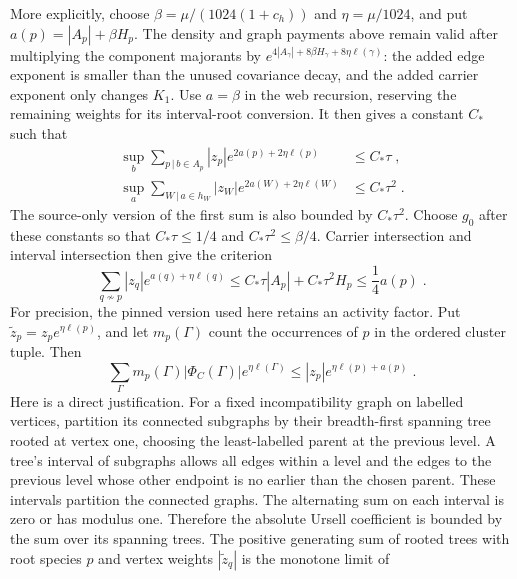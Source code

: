 \documentclass[11pt]{article}
\begin{document}
More explicitly, choose $\beta=\mu/(1024(1+c_h))$ and $\eta=\mu/1024$, and put $a(p)=|A_p|+\beta H_p$. The density and graph payments above remain valid after multiplying the component majorants by $e^{4|A_\gamma|+8\beta H_\gamma+8\eta\ell(\gamma)}$: the added edge exponent is smaller than the unused covariance decay, and the added carrier exponent only changes $K_1$. Use $a=\beta$ in the web recursion, reserving the remaining weights for its interval-root conversion. It then gives a constant $C_*$ such that
\begin{equation}\label{eq:marginal-weighted-loads}
    \begin{aligned}
        \sup_b\sum_{p\, | \,b\in A_p}
            |z_p|e^{2a(p)+2\eta\ell(p)}&\leq C_*\tau\;,\\
        \sup_a\sum_{W\, | \,a\in h_W}
            |z_W|e^{2a(W)+2\eta\ell(W)}&\leq C_*\tau^2\;.
    \end{aligned}
\end{equation}
The source-only version of the first sum is also bounded by $C_*\tau^2$. Choose $g_0$ after these constants so that $C_*\tau\leq 1/4$ and $C_*\tau^2\leq \beta/4$. Carrier intersection and interval intersection then give the criterion
\begin{equation}\label{eq:marginal-KP-payment}
    \sum_{q\not \sim p}|z_q|e^{a(q)+\eta\ell(q)}
        \leq C_*\tau|A_p|+C_*\tau^2H_p
        \leq \frac{1}{4}a(p)\;.
\end{equation}
For precision, the pinned version used here retains an activity factor. Put $\widetilde z_p=z_pe^{\eta\ell(p)}$, and let $m_p(\Gamma)$ count the occurrences of $p$ in the ordered cluster tuple. Then
\begin{equation}\label{eq:marginal-pinned-bound}
    \sum_\Gamma m_p(\Gamma)|\Phi_C(\Gamma)|e^{\eta\ell(\Gamma)}
        \leq |z_p|e^{\eta\ell(p)+a(p)}\;.
\end{equation}
Here is a direct justification. For a fixed incompatibility graph on labelled vertices, partition its connected subgraphs by their breadth-first spanning tree rooted at vertex one, choosing the least-labelled parent at the previous level. A tree's interval of subgraphs allows all edges within a level and the edges to the previous level whose other endpoint is no earlier than the chosen parent. These intervals partition the connected graphs. The alternating sum on each interval is zero or has modulus one. Therefore the absolute Ursell coefficient is bounded by the sum over its spanning trees. The positive generating sum of rooted trees with root species $p$ and vertex weights $|\widetilde z_q|$ is the monotone limit of
\end{document}
